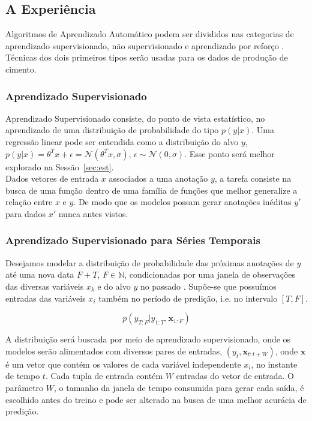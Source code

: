 \subsection{A Experiência}
\label{sec:exp}
Algoritmos de Aprendizado Automático podem ser divididos nas categorias de
aprendizado supervisionado, não supervisionado e aprendizado por reforço
\citep{dlbook}. Técnicas dos dois primeiros tipos serão usadas para os dados de
produção de cimento.


\subsubsection{Aprendizado Supervisionado}
\label{sec:apren} 
Aprendizado Supervisionado consiste, do ponto de vista estatístico, no
aprendizado de uma distribuição de probabilidade do tipo $p(y | x)$. Uma
regressão linear pode ser entendida como a distribuição do alvo $y$, $p(y | x) = \theta^Tx + \epsilon =
\mathcal{N}(\theta^Tx,\sigma) $, $\epsilon \sim \mathcal{N}(0,\sigma)$. Esse ponto será melhor
explorado na Sessão~\ref{sec:est}. \\ 

Dados vetores de entrada $x$ associados a uma anotação $y$, a tarefa consiste na busca de uma
função dentro de uma família de funções que melhor generalize a relação entre
$x$ e $y$. De modo que os modelos possam gerar anotações inéditas $y'$ para
dados $x'$ nunca antes vistos. 


\subsubsection{Aprendizado Supervisionado para Séries Temporais}

Desejamos modelar a distribuição de probabilidade das próximas anotações
de $y$ até uma nova data $F + T$, $F \in \mathbb{N}$, condicionadas por uma janela de
observações das diversas variáveis  $x_k$ e do alvo $y$ no passado
\citep{deepfactors}. Supõe-se que possuímos entradas das
variáveis $x_i$ também no período de predição, i.e. no intervalo $[T,F]$.

\[ p(y_{T:F} | y_{1:T},\textbf{x}_{{1}:F}) \]

A distribuição será buscada por meio de aprendizado supervisionado, onde os
modelos serão alimentados com diversos pares de entradas,
$(y_t,\textbf{x}_{t:t+W})$, onde $\textbf{x}$ é um vetor que contém os valores de
cada variável independente $x_i$, no instante de tempo $t$. Cada tupla de
entrada contém $W$ entradas do vetor de entrada. O parâmetro $W$, o
tamanho da janela de tempo consumida para gerar cada saída, é escolhido antes do
treino e pode ser alterado na busca de uma melhor acurácia de predição.


